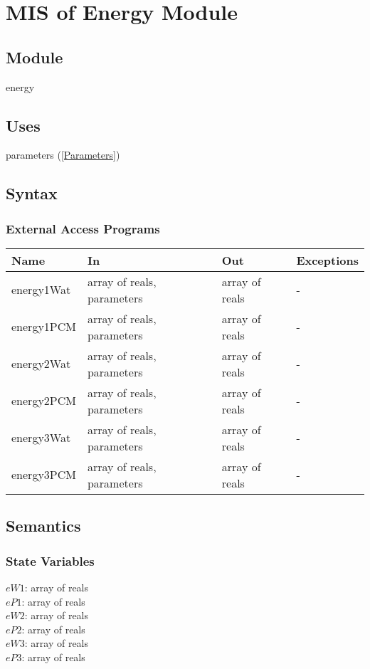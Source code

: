 \documentclass[12pt]{article}
\begin{document}
\section{MIS of Energy Module} \label{Energy}
\subsection{Module}
energy
\subsection{Uses}
parameters (\ref{Parameters})
\subsection{Syntax}
\subsubsection{External Access Programs}
\begin{center}
\begin{tabular}{p{3cm} p{6cm} p{3cm} p{2cm}}
\hline
\textbf{Name} & \textbf{In} & \textbf{Out} & \textbf{Exceptions} \\
\hline
energy1Wat & array of reals, parameters & array of reals & - \\
\hline
energy1PCM & array of reals, parameters & array of reals & - \\
\hline
energy2Wat & array of reals, parameters & array of reals & - \\
\hline
energy2PCM & array of reals, parameters & array of reals & - \\
\hline
energy3Wat & array of reals, parameters & array of reals & - \\
\hline
energy3PCM & array of reals, parameters & array of reals & - \\
\hline
\end{tabular}
\end{center}
\subsection{Semantics}
\subsubsection{State Variables}
$eW1$: array of reals \\
$eP1$: array of reals \\
$eW2$: array of reals \\
$eP2$: array of reals \\
$eW3$: array of reals \\
$eP3$: array of reals 
\end{document}
